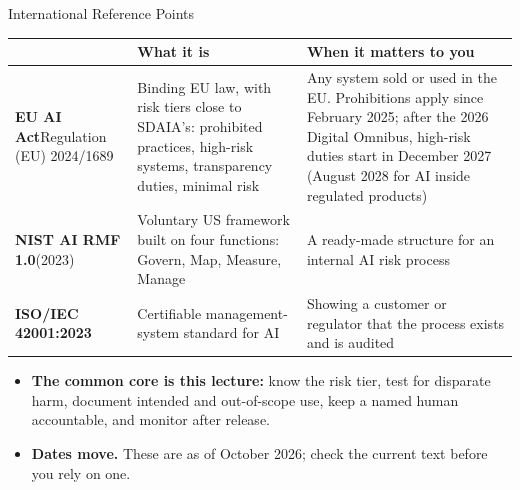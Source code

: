 \begin{frame}{International Reference Points}

    \centering
    \renewcommand{\arraystretch}{1.35}
    {\scriptsize
    \begin{tabular}{p{2.8cm}|p{4.5cm}|p{4.5cm}}
        \toprule
                                       & \textbf{What it is} & \textbf{When it matters to you} \\
        \midrule
        \textbf{EU AI Act}\newline Regulation (EU) 2024/1689
            & Binding EU law, with risk tiers close to SDAIA's: prohibited practices, high-risk systems,
              transparency duties, minimal risk
            & Any system sold or used in the EU. Prohibitions apply since February 2025; after the 2026
              Digital Omnibus, high-risk duties start in December 2027 (August 2028 for AI inside
              regulated products) \\
        \textbf{NIST AI RMF 1.0}\newline (2023)
            & Voluntary US framework built on four functions: Govern, Map, Measure, Manage
            & A ready-made structure for an internal AI risk process \\
        \textbf{ISO/IEC 42001:2023}
            & Certifiable management-system standard for AI
            & Showing a customer or regulator that the process exists and is audited \\
        \bottomrule
    \end{tabular}}

    \vspace{0.6em}
    \begin{itemize}
        \item \textbf{The common core is this lecture:} know the risk tier, test for disparate harm,
              document intended and out-of-scope use, keep a named human accountable, and monitor
              after release.
        \item \textbf{Dates move.} These are as of October 2026; check the current text before you rely on
              one.
    \end{itemize}

\end{frame}
